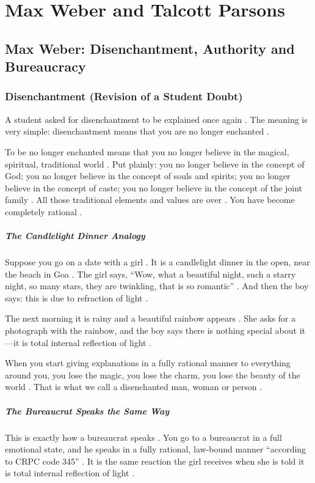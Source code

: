 \chapter{Max Weber and Talcott Parsons}

\section{Max Weber: Disenchantment, Authority and Bureaucracy}

\subsection{Disenchantment (Revision of a Student Doubt)}
A student asked for disenchantment to be explained once again . The meaning is very simple: disenchantment means that you are no longer enchanted .

\begin{KeyConcept}
To be no longer enchanted means that you no longer believe in the magical, spiritual, traditional world .
Put plainly: you no longer believe in the concept of God; you no longer believe in the concept of souls and spirits; you no longer believe in the concept of caste; you no longer believe in the concept of the joint family .
All those traditional elements and values are over . You have become completely rational .
\end{KeyConcept}

\paragraph{The Candlelight Dinner Analogy}
Suppose you go on a date with a girl . It is a candlelight dinner in the open, near the beach in Goa . The girl says, ``Wow, what a beautiful night, such a starry night, so many stars, they are twinkling, that is so romantic'' . And then the boy says: this is due to refraction of light .

The next morning it is rainy and a beautiful rainbow appears . She asks for a photograph with the rainbow, and the boy says there is nothing special about it---it is total internal reflection of light .

When you start giving explanations in a fully rational manner to everything around you, you lose the magic, you lose the charm, you lose the beauty of the world . That is what we call a disenchanted man, woman or person .

\paragraph{The Bureaucrat Speaks the Same Way}
This is exactly how a bureaucrat speaks . You go to a bureaucrat in a full emotional state, and he speaks in a fully rational, law-bound manner ``according to CRPC code 345'' . It is the same reaction the girl receives when she is told it is total internal reflection of light .


